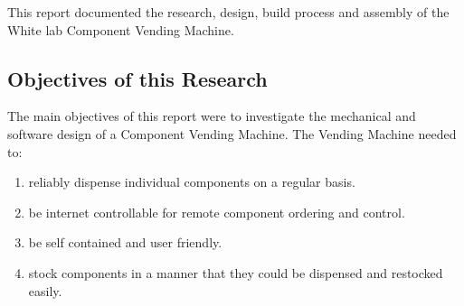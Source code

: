 \documentclass[a4paper,11pt]{article}
\numberwithin{figure}{section}
\numberwithin{table}{section}
\begin{document}
This report documented the research, design, build process and assembly of the White lab Component Vending Machine. 
	\subsection{Objectives of this Research}
The main objectives of this report were to investigate the mechanical and software design of a Component Vending Machine. The Vending Machine needed to:
\begin{enumerate}
\item reliably dispense individual components on a regular basis.
\item be internet controllable for remote component ordering and control.
\item be self contained and user friendly.
\item stock components in a manner that they could be dispensed and restocked easily.
\end{enumerate}
\end{document}
